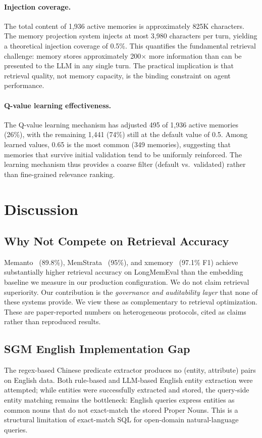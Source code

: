 \documentclass{article}
\begin{document}
\paragraph{Injection coverage.} The total content of 1{,}936 active memories is approximately 825K characters. The memory projection system injects at most 3{,}980 characters per turn, yielding a theoretical injection coverage of 0.5\%. This quantifies the fundamental retrieval challenge: memory stores approximately 200$\times$ more information than can be presented to the LLM in any single turn. The practical implication is that retrieval quality, not memory capacity, is the binding constraint on agent performance.

\paragraph{Q-value learning effectiveness.} The Q-value learning mechanism has adjusted 495 of 1{,}936 active memories (26\%), with the remaining 1{,}441 (74\%) still at the default value of 0.5. Among learned values, 0.65 is the most common (349 memories), suggesting that memories that survive initial validation tend to be uniformly reinforced. The learning mechanism thus provides a coarse filter (default vs.\ validated) rather than fine-grained relevance ranking.

\section{Discussion}
\label{sec:disc}

\subsection{Why Not Compete on Retrieval Accuracy}
Memanto~\citep{memanto} (89.8\%), MemStrata~\citep{memstrata} (95\%), and xmemory~\citep{xmemory} (97.1\% F1) achieve substantially higher retrieval accuracy on LongMemEval than the embedding baseline we measure in our production configuration. We do not claim retrieval superiority. Our contribution is the \emph{governance and auditability layer} that none of these systems provide. We view these as complementary to retrieval optimization. These are paper-reported numbers on heterogeneous protocols, cited as claims rather than reproduced results.

\subsection{SGM English Implementation Gap}
The regex-based Chinese predicate extractor produces no (entity, attribute) pairs on English data. Both rule-based and LLM-based English entity extraction were attempted; while entities were successfully extracted and stored, the query-side entity matching remains the bottleneck: English queries express entities as common nouns that do not exact-match the stored Proper Nouns. This is a structural limitation of exact-match SQL for open-domain natural-language queries.
\end{document}
